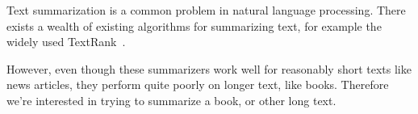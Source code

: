 Text summarization is a common problem in natural language processing. There
exists a wealth of existing algorithms for summarizing text, for example the
widely used TextRank~\cite{mihalcea2004textrank}.

However, even though these summarizers work well for reasonably short texts
like news articles, they perform quite poorly on longer text, like books.
Therefore we're interested in trying to summarize a book, or other long text.
